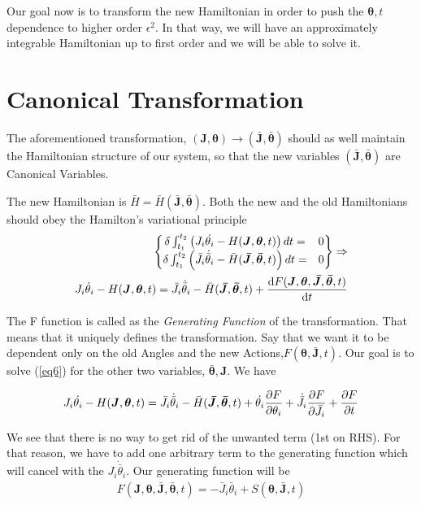 	Our goal now is to transform the new Hamiltonian in order to push the $\bm{\theta},t$ dependence to higher order $\epsilon ^2$. In that way, we will have an approximately integrable Hamiltonian up to first order and we will be able to solve it. 
	
	\section{Canonical Transformation}
	
	The aforementioned transformation, $(\bm{J},\bm{\theta})\rightarrow(\bm{\bar{J}},\bm{\bar{\theta}})$ should as well maintain the Hamiltonian structure of our system, so that the new variables $(\bm{\bar{J}},\bm{\bar{\theta}})$ are Canonical Variables.
	
	The new Hamiltonian is $\bar{H} = \bar{H}(\bm{\bar{J}},\bm{\bar{\theta}})$. Both the new and the old Hamiltonians should obey the Hamilton's variational principle 
	\begin{align}\label{eq6}
		\left\{
		\begin{matrix}
				\delta\int_{t_1}^{t_2}\left( J_i \dot{\theta_i} - H(\bm{J},\bm{\theta},t)\right)dt =& 0\\
				 \delta\int_{t_1}^{t_2}\left( \bar{J}_i \dot{\bar{\theta}}_i - \bar{H}(\bm{\bar{J}},\bm{\bar{\theta}},t)\right)dt =& 0
		\end{matrix}  \right\}\Rightarrow \nonumber \\
		J_i \dot{\theta}_i - H(\bm{J},\bm{\theta},t) =\bar{J}_i \dot{\bar{\theta}}_i - \bar{H}(\bm{\bar{J}},\bm{\bar{\theta}},t) + \odv{F(\bm{J},\bm{\theta},\bm{\bar{J}},\bm{\bar{\theta}},t)}{t} 
	\end{align}
	
	The F function is called as the \textit{Generating Function} of the transformation. That means that it uniquely defines the transformation. Say that we want it to be dependent only on the old Angles and the new Actions,$F(\bm{\theta},\bm{\bar{J}},t)$. Our goal is to solve (\ref{eq6}) for the other two variables, $\bm{\bar{\theta}},\bm{J}$. We have  
	
		\begin{align*}
			J_i\dot{\theta_i}- H(\bm{J},\bm{\theta},t) =\bar{J}_i \dot{\bar{\theta}}_i - \bar{H}(\bm{\bar{J}},\bm{\bar{\theta}},t) + \dot{\theta_i}\pdv{F}{\theta_i} + \dot{\bar{J}}_i\pdv{F}{\bar{J}_i} + \pdv{F}{t}
		\end{align*}
	
	We see that there is no way to get rid of the unwanted term (1st on RHS). For that reason, we have to add one arbitrary term to the generating function which will cancel with the $J_i\dot{\bar{\theta}}_i$. Our generating function will be 
		\begin{align}
			F(\bm{J},\bm{\theta},\bm{\bar{J}},\bm{\bar{\theta}},t) = -\bar{J}_i\bar{\theta}_i + S(\bm{\theta},\bm{\bar{J}},t)
		\end{align}
	
